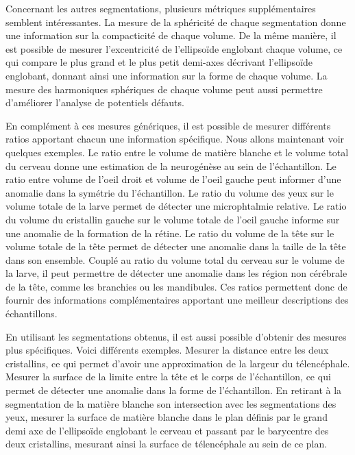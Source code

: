 \documentclass[\main/main.tex]{subfiles}
\begin{document}
%
Concernant les autres segmentations, plusieurs métriques supplémentaires semblent intéressantes.
%
La mesure de la sphéricité de chaque segmentation donne une information sur la compacticité de chaque volume.
%
De la même manière, il est possible de mesurer l'excentricité de l'ellipsoïde englobant chaque volume, ce qui compare le plus grand et le plus petit demi-axes décrivant l'ellipsoïde englobant, donnant ainsi une information sur la forme de chaque volume.
%
La mesure des harmoniques sphériques de chaque volume peut aussi permettre d'améliorer l'analyse de potentiels défauts.

En complément à ces mesures génériques, il est possible de mesurer différents ratios apportant chacun une information spécifique.
%
Nous allons maintenant voir quelques exemples.
%
Le ratio entre le volume de matière blanche et le volume total du cerveau donne une estimation de la neurogénèse au sein de l'échantillon.
%
Le ratio entre volume de l'oeil droit et volume de l'oeil gauche peut informer d'une anomalie dans la symétrie du l'échantillon.
%
Le ratio du volume des yeux sur le volume totale de la larve permet de détecter une microphtalmie relative.
%
Le ratio du volume du cristallin gauche sur le volume totale de l'oeil gauche informe sur une anomalie de la formation de la rétine.
%
Le ratio du volume de la tête sur le volume totale de la tête permet de détecter une anomalie dans la taille de la tête dans son ensemble.
%
Couplé au ratio du volume total du cerveau sur le volume de la larve, il peut permettre de détecter une anomalie dans les région non cérébrale de la tête, comme les branchies ou les mandibules.
%
Ces ratios permettent donc de fournir des informations complémentaires apportant une meilleur descriptions des échantillons.

%
En utilisant les segmentations obtenus, il est aussi possible d'obtenir des mesures plus spécifiques.
%
Voici différents exemples.
%
Mesurer la distance entre les deux cristallins, ce qui permet d'avoir une approximation de la largeur du télencéphale.
%
Mesurer la surface de la limite entre la tête et le corps de l'échantillon, ce qui permet de détecter une anomalie dans la forme de l'échantillon.
%
En retirant à la segmentation de la matière blanche son intersection avec les segmentations des yeux,
mesurer la surface de matière blanche dans le plan définis par le grand demi axe de l'ellipsoïde englobant le cerveau et passant par le barycentre des deux cristallins, mesurant ainsi la surface de télencéphale au sein de ce plan.
%
\end{document}
